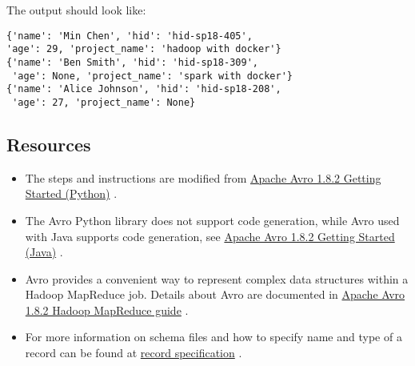 The output should look like:

\begin{lstlisting}
{'name': 'Min Chen', 'hid': 'hid-sp18-405', 
'age': 29, 'project_name': 'hadoop with docker'}
{'name': 'Ben Smith', 'hid': 'hid-sp18-309',
 'age': None, 'project_name': 'spark with docker'}
{'name': 'Alice Johnson', 'hid': 'hid-sp18-208',
 'age': 27, 'project_name': None}
\end{lstlisting}

\subsection{Resources}

\begin{itemize}
\item
  The steps and instructions are modified from
  \href{http://avro.apache.org/docs/1.8.2/gettingstartedpython.html}{Apache
  Avro 1.8.2 Getting Started (Python)}
  \cite{hid-sp18-405-tutorial-avro-python}.
\item
  The Avro Python library does not support code generation, while Avro
  used with Java supports code generation, see
  \href{http://avro.apache.org/docs/1.8.2/gettingstartedjava.html}{Apache
  Avro 1.8.2 Getting Started (Java)}
  \cite{hid-sp18-405-tutorial-avro-java}.
\item
  Avro provides a convenient way to represent complex data structures
  within a Hadoop MapReduce job. Details about Avro are documented in
  \href{http://avro.apache.org/docs/1.8.2/mr.html}{Apache Avro 1.8.2
  Hadoop MapReduce guide} \cite{hid-sp18-405-tutorial-avro-mapreduce}.
\item
  For more information on schema files and how to specify name and type
  of a record can be found at
  \href{http://avro.apache.org/docs/1.8.2/spec.html\#schema_record}{record
  specification} \cite{hid-sp18-405-tutorial-avro-record}.
\end{itemize}

